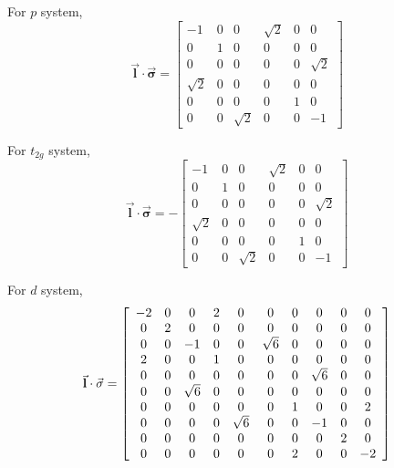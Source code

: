 For $p$ system,
\begin{equation}
\vec{\mathbf{l}}\cdot\vec{\mathbf{\sigma}}=\left[\begin{array}{cccccc}
-1 & 0 & 0 & \sqrt{2} & 0 & 0\\
0 & 1 & 0 & 0 & 0 & 0\\
0 & 0 & 0 & 0 & 0 & \sqrt{2}\\
\sqrt{2} & 0 & 0 & 0 & 0 & 0\\
0 & 0 & 0 & 0 & 1 & 0\\
0 & 0 & \sqrt{2} & 0 & 0 & -1
\end{array}\right]
\end{equation}


For $t_{2g}$ system, 
\begin{equation}
\vec{\mathbf{l}}\cdot\vec{\mathbf{\sigma}}=-\left[\begin{array}{cccccc}
-1 & 0 & 0 & \sqrt{2} & 0 & 0\\
0 & 1 & 0 & 0 & 0 & 0\\
0 & 0 & 0 & 0 & 0 & \sqrt{2}\\
\sqrt{2} & 0 & 0 & 0 & 0 & 0\\
0 & 0 & 0 & 0 & 1 & 0\\
0 & 0 & \sqrt{2} & 0 & 0 & -1
\end{array}\right]
\end{equation}


For $d$ system,
\begin{equation}
\vec{\mathbf{l}}\cdot\vec{\mathbf{\sigma}}=\left[\begin{array}{cccccccccc}
-2 & 0 & 0 & 2 & 0 & 0 & 0 & 0 & 0 & 0\\
0 & 2 & 0 & 0 & 0 & 0 & 0 & 0 & 0 & 0\\
0 & 0 & -1 & 0 & 0 & \sqrt{6} & 0 & 0 & 0 & 0\\
2 & 0 & 0 & 1 & 0 & 0 & 0 & 0 & 0 & 0\\
0 & 0 & 0 & 0 & 0 & 0 & 0 & \sqrt{6} & 0 & 0\\
0 & 0 & \text{\ensuremath{\sqrt{6}}} & 0 & 0 & 0 & 0 & 0 & 0 & 0\\
0 & 0 & 0 & 0 & 0 & 0 & 1 & 0 & 0 & 2\\
0 & 0 & 0 & 0 & \sqrt{6} & 0 & 0 & -1 & 0 & 0\\
0 & 0 & 0 & 0 & 0 & 0 & 0 & 0 & 2 & 0\\
0 & 0 & 0 & 0 & 0 & 0 & 2 & 0 & 0 & -2
\end{array}\right]
\end{equation}


